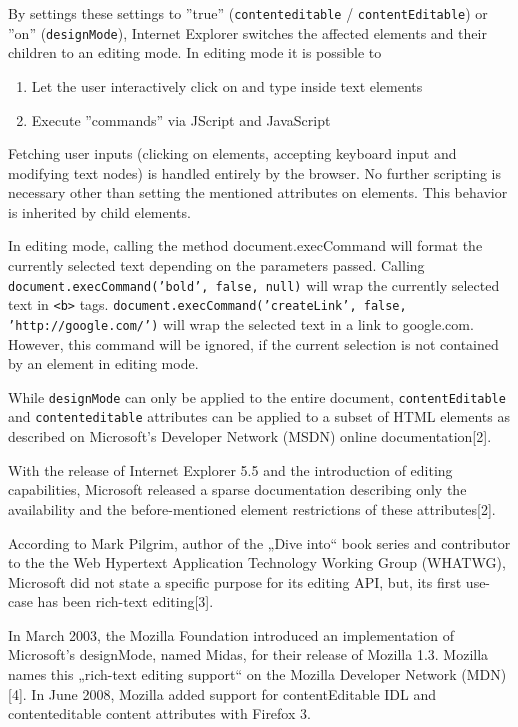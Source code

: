 By settings these settings to ''true'' (\texttt{contenteditable} / \texttt{contentEditable}) or ''on'' (\texttt{designMode}), Internet Explorer switches the affected elements and their children to an editing mode. In editing mode it is possible to

\begin{enumerate} \item Let the user interactively click on and type inside text elements \item Execute ''commands'' via JScript and JavaScript\end{enumerate}

Fetching user inputs (clicking on elements, accepting keyboard input and modifying text nodes) is handled entirely by the browser. No further scripting is necessary other than setting the mentioned attributes on elements. This behavior is inherited by child elements.

In editing mode, calling the method document.execCommand will format the currently selected text depending on the parameters passed. Calling \texttt{document.execCommand('bold', false, null)} will wrap the currently selected text in \texttt{<b>} tags. \texttt{document.execCommand('createLink', false, 'http://google.com/')} will wrap the selected text in a link to google.com. However, this command will be ignored, if the current selection is not contained by an element in editing mode.

While \texttt{designMode} can only be applied to the entire document, \texttt{contentEditable} and \texttt{contenteditable}  attributes can be applied to a subset of HTML elements as described on Microsoft's Developer Network (MSDN) online documentation[2].

With the release of Internet Explorer 5.5 and the introduction of editing capabilities, Microsoft released a sparse documentation describing only the availability and the before-mentioned element restrictions of these attributes[2]. 

According to Mark Pilgrim, author of the „Dive into“ book series and contributor to the the Web Hypertext Application Technology Working Group (WHATWG), Microsoft did not state a specific purpose for its editing API, but, its first use-case has been rich-text editing[3].

In March 2003, the Mozilla Foundation introduced an implementation of Microsoft's designMode, named Midas, for their release of Mozilla 1.3. Mozilla names this „rich-text editing support“ on the Mozilla Developer Network (MDN)[4]. In June 2008, Mozilla added support for contentEditable IDL and contenteditable content attributes with Firefox 3. 


